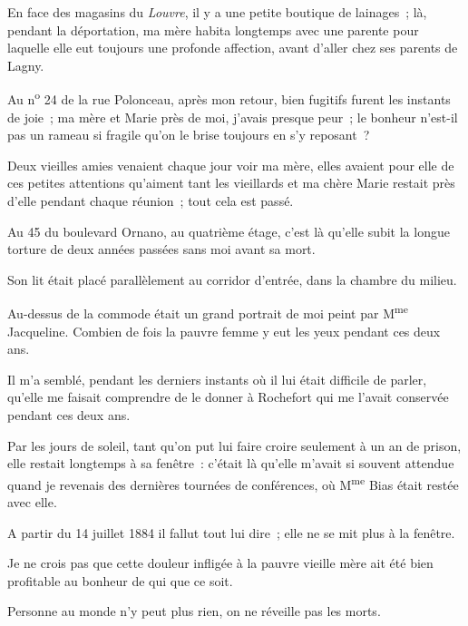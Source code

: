 \documentclass[french,twoside]{book} %
\newcommand{\astertri}{\medskip\par\centerline{\color{rubric}\large\selectfont{\syms ✻\,✻\,✻}}\medskip\par}%
\begin{document}
\bigbreak
\noindent En face des magasins du \emph{Louvre}, il y a une petite boutique de lainages ; là, pendant la déportation, ma mère habita longtemps avec une parente pour laquelle elle eut toujours une profonde  affection, avant d’aller chez ses parents de Lagny.\par
Au n\textsuperscript{o} 24 de la rue Polonceau, après mon retour, bien fugitifs furent les instants de joie ; ma mère et Marie près de moi, j’avais presque peur ; le bonheur n’est-il pas un rameau si fragile qu’on le brise toujours en s’y reposant ?\par
Deux vieilles amies venaient chaque jour voir ma mère, elles avaient pour elle de ces petites attentions qu’aiment tant les vieillards et ma chère Marie restait près d’elle pendant chaque réunion ; tout cela est passé.\par
\bigbreak

\astertri

\bigbreak
\noindent Au 45 du boulevard Ornano, au quatrième étage, c’est là qu’elle subit la longue torture de deux années passées sans moi avant sa mort.\par
Son lit était placé parallèlement au corridor d’entrée, dans la chambre du milieu.\par
Au-dessus de la commode était un grand portrait de moi peint par M\textsuperscript{me} Jacqueline. Combien de fois la pauvre femme y eut les yeux pendant ces deux ans.\par
Il m’a semblé, pendant les derniers instants où il lui était difficile de parler, qu’elle me faisait comprendre de le donner à Rochefort qui me l’avait conservée pendant ces deux ans.\par
 Par les jours de soleil, tant qu’on put lui faire croire seulement à un an de prison, elle restait longtemps à sa fenêtre : c’était là qu’elle m’avait si souvent attendue quand je revenais des dernières tournées de conférences, où M\textsuperscript{me} Bias était restée avec elle.\par
A partir du 14 juillet 1884 il fallut tout lui dire ; elle ne se mit plus à la fenêtre.\par
Je ne crois pas que cette douleur infligée à la pauvre vieille mère ait été bien profitable au bonheur de qui que ce soit.\par
Personne au monde n’y peut plus rien, on ne réveille pas les morts.\par
\bigbreak

\astertri
\end{document}
